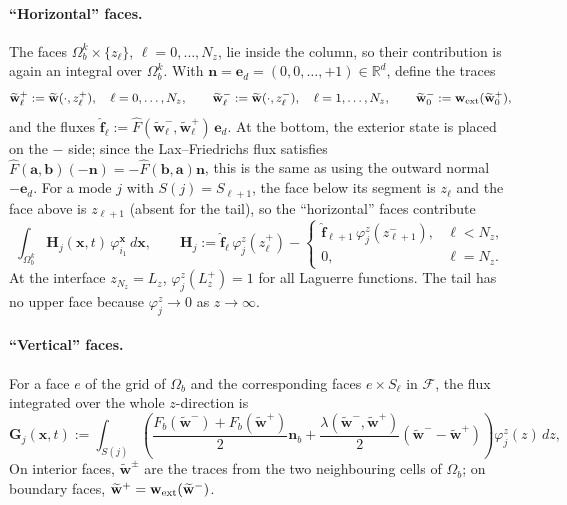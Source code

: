 \documentclass[11pt]{article}
\newcommand{\Rbb}{\mathbb{R}}
\newcommand{\bw}{\mathbf{w}}
\newcommand{\wt}{\widetilde{\mathbf{w}}}
\newcommand{\bx}{\mathbf{x}}
\newcommand{\bn}{\mathbf{n}}
\newcommand{\bff}{\mathbf{f}}
\newcommand{\be}{\mathbf{e}}
\begin{document}
	\paragraph{``Horizontal'' faces.} The faces $\Omega_b^k\times\{z_\ell\}$, $\ell=0,\dots,N_z$, lie inside the column, so their contribution is again an integral over $\Omega_b^k$. With $\bn=\be_d=(0,0,\dots,+1)\in\Rbb^d$, define the traces
	\[
	\wt^+_\ell:=\wt(\cdot,z_\ell^+),\quad \ell=0,\dots,N_z,\qquad
	\wt^-_\ell:=\wt(\cdot,z_\ell^-),\quad \ell=1,\dots,N_z,\qquad
	\wt^-_0:=\bw_{\rm ext}(\wt^+_0),
	\]
	and the fluxes $\widehat{\bff}_\ell:=\widehat{F}(\wt^-_\ell,\wt^+_\ell)\,\be_d$. At the bottom, the exterior state is placed on the $-$ side; since the Lax--Friedrichs flux satisfies $\widehat{F}(\mathbf{a},\mathbf{b})(-\bn)=-\widehat{F}(\mathbf{b},\mathbf{a})\bn$, this is the same as using the outward normal $-\be_d$. For a mode $j$ with $S(j)=S_{\ell+1}$, the face below its segment is $z_\ell$ and the face above is $z_{\ell+1}$ (absent for the tail), so the ``horizontal'' faces contribute
	\begin{equation}\label{eq:H}
		\int_{\Omega_b^k}\mathbf{H}_j(\bx,t)\,\varphi^\bx_{i_1}\,d\bx,\qquad
		\mathbf{H}_j:=\widehat{\bff}_\ell\,\varphi^z_j(z_\ell^+)-\begin{cases}\widehat{\bff}_{\ell+1}\,\varphi^z_j(z_{\ell+1}^-), & \ell<N_z,\\ 0, & \ell=N_z.\end{cases}
	\end{equation}
	At the interface $z_{N_z}=L_z$, $\varphi^z_j(L_z^+)=1$ for all Laguerre functions. The tail has no upper face because $\varphi^z_j\to0$ as $z\to\infty$.
	
	\paragraph{``Vertical'' faces.} For a face $e$ of the grid of $\Omega_b$ and the corresponding faces $e\times S_\ell$ in $\mathcal{F}$, the flux integrated over the whole $z$-direction is
	\begin{equation}\label{eq:G}
		\mathbf{G}_j(\bx,t):=\int_{S(j)}\left(\frac{F_b(\wt^-)+F_b(\wt^+)}{2}\bn_b+\frac{\lambda(\wt^-,\wt^+)}{2}(\wt^--\wt^+)\right)\varphi^z_j(z)\,dz,
	\end{equation}
	On interior faces, $\wt^\pm$ are the traces from the two neighbouring cells of $\Omega_b$; on boundary faces, $\wt^+=\bw_{\rm ext}(\wt^-)$.
	
\end{document}
